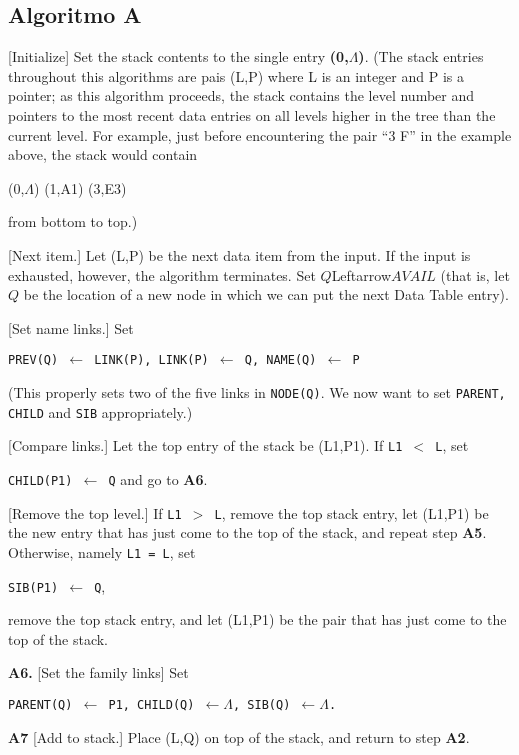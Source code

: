 \subsection{Algoritmo A}

 [Initialize] Set the stack contents to the single
entry {\bf (0,$\Lambda$)}. (The stack entries throughout this
algorithms are pais (L,P) where L is an integer and P is a pointer; as
this algorithm proceeds, the stack contains the level number and
pointers to the most recent data entries on all levels higher in the
tree than the current level. For example, just before encountering the
pair ``3 F'' in the example above, the stack would contain

\begin{center}
(0,$\Lambda$) (1,A1) (3,E3)
\end{center}
from bottom to top.)

 [Next item.] Let (L,P) be the next data item from
the input. If the input is exhausted, however, the algorithm
terminates. Set $Q $Leftarrow$ AVAIL$ (that is, let $Q$ be the
location of a new node in which we can put the next Data Table entry).

 [Set name links.] Set
\begin{center}
{\tt PREV(Q) $\leftarrow$ LINK(P), LINK(P) $\leftarrow$ Q, NAME(Q)
$\leftarrow$ P}
\end{center}
(This properly sets two of the five links in {\tt NODE(Q)}. We now
want to set {\tt PARENT, CHILD} and {\tt SIB} appropriately.)

 [Compare links.] Let the top entry of the stack be
(L1,P1). If {\tt L1 $<$ L}, set
\begin{center}
{\tt CHILD(P1) $\leftarrow$ Q} and go to {\bf A6}.
\end{center}

 [Remove the top level.] If {\tt L1 $>$ L}, remove
the top stack entry, let (L1,P1) be the new entry that has just come
to the top of the stack, and repeat step {\bf A5}. Otherwise, namely
{\tt L1 = L}, set
\begin{center}
{\tt SIB(P1) $\leftarrow$ Q},
\end{center}
remove the top stack entry, and let (L1,P1) be the pair that has just
come to the top of the stack.

{\bf A6.} [Set the family links] Set
\begin{center}
{\tt PARENT(Q) $\leftarrow$ P1, CHILD(Q) $\leftarrow \Lambda$, SIB(Q)
$\leftarrow \Lambda$.}

{\bf A7} [Add to stack.] Place (L,Q) on top of the stack, and return
to step {\bf A2}.

\end{center}

